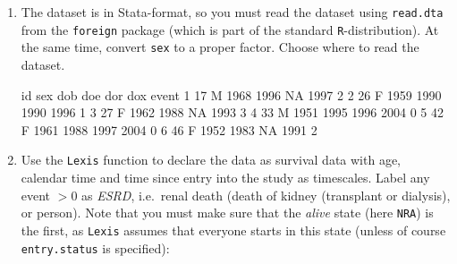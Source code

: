 \documentclass[
]{book}
\newenvironment{Shaded}{\begin{snugshade}}{\end{snugshade}}
\newcommand{\AttributeTok}[1]{\textcolor[rgb]{0.13,0.29,0.53}{#1}}
\newcommand{\CommentTok}[1]{\textcolor[rgb]{0.56,0.35,0.01}{\textit{#1}}}
\newcommand{\FunctionTok}[1]{\textcolor[rgb]{0.13,0.29,0.53}{\textbf{#1}}}
\newcommand{\NormalTok}[1]{#1}
\newcommand{\OtherTok}[1]{\textcolor[rgb]{0.56,0.35,0.01}{#1}}
\newcommand{\SpecialCharTok}[1]{\textcolor[rgb]{0.81,0.36,0.00}{\textbf{#1}}}
\newcommand{\StringTok}[1]{\textcolor[rgb]{0.31,0.60,0.02}{#1}}
\begin{document}
\begin{enumerate}
\def\labelenumi{\arabic{enumi}.}
\item
  The dataset is in Stata-format, so you must read the dataset
  using \texttt{read.dta} from the \texttt{foreign} package (which is
  part of the standard \texttt{R}-distribution). At the same time, convert
  \texttt{sex} to a proper factor. Choose where to read the dataset.

\begin{Shaded}
\end{Shaded}

\begin{Shaded}
\begin{Highlighting}[]
\NormalTok{  id sex  dob  doe  dor  dox event}
\NormalTok{1 17   M 1968 1996   NA 1997     2}
\NormalTok{2 26   F 1959 1990 1990 1996     1}
\NormalTok{3 27   F 1962 1988   NA 1993     3}
\NormalTok{4 33   M 1951 1995 1996 2004     0}
\NormalTok{5 42   F 1961 1988 1997 2004     0}
\NormalTok{6 46   F 1952 1983   NA 1991     2}
\end{Highlighting}
\end{Shaded}
\item
  Use the \texttt{Lexis} function to declare the data as
  survival data with age, calendar time and time since entry into
  the study as timescales. Label any event \(>0\) as \emph{ESRD},
  i.e.~renal death (death of kidney (transplant or dialysis), or
  person).
  Note that you must make sure that the \emph{alive} state (here
  \texttt{NRA}) is the first, as \texttt{Lexis} assumes that
  everyone starts in this state (unless of course
  \texttt{entry.status} is specified):


\end{enumerate}
\end{document}
